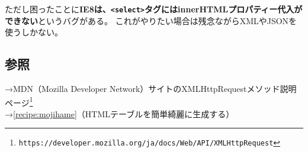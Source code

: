 ただし困ったことに\textbf{IE8は、\verb|<select>|タグにはinnerHTMLプロパティー代入ができない}というバグがある。
これがやりたい場合は残念ながらXMLやJSONを使うしかない。

\subsection*{参照}

\noindent
→MDN（Mozilla Developer Network）サイトのXMLHttpRequestメソッド説明ページ\footnote{\verb|https://developer.mozilla.org/ja/docs/Web/API/XMLHttpRequest|} \\
→\ref{recipe:mojihame}（HTMLテーブルを簡単綺麗に生成する）
